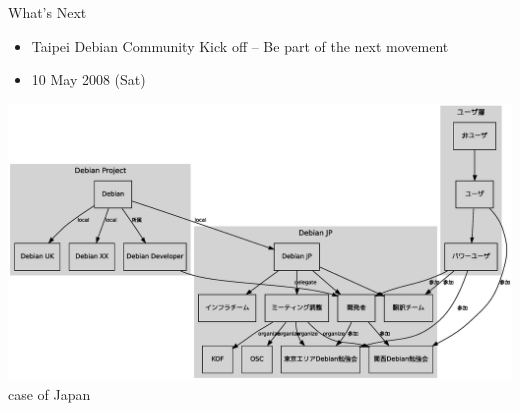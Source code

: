 \documentclass[cjk,dvipdfm,12pt]{beamer}
\begin{document}
\begin{frame}{What's Next}
 \begin{itemize}
  \item Taipei Debian Community Kick off 
	-- Be part of the next movement
  \item 10 May 2008 (Sat)
 \end{itemize}

\includegraphics[width=1\hsize]{image200712/debianmeetinganddebianjp.eps}
case of Japan

\end{frame}
\end{document}
